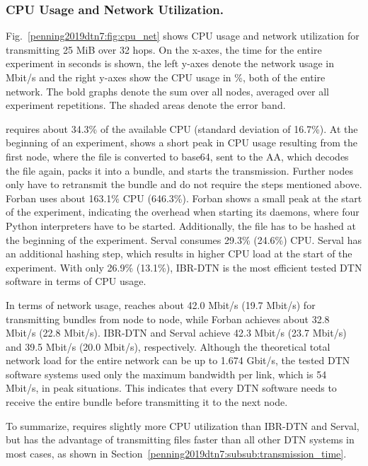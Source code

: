 \subsubsection{CPU Usage and Network Utilization.}


Fig.~\ref{penning2019dtn7:fig:cpu_net} shows CPU usage and network utilization for transmitting 25 MiB over 32 hops.
On the x-axes, the time for the entire experiment in seconds is shown, the left y-axes denote the network usage in Mbit/s and the right y-axes show the CPU usage in \%, both of the entire network.
The bold graphs denote the sum over all nodes, averaged over all experiment repetitions.
The shaded areas denote the error band.

\dtn requires about 34.3\% of the available CPU (standard deviation of 16.7\%).
At the beginning of an experiment, \dtn shows a short peak in CPU usage resulting from the first node, where the file is converted to base64, sent to the \dtn AA, which decodes the file again, packs it into a bundle, and starts the transmission.
Further nodes only have to retransmit the bundle and do not require the steps mentioned above.
Forban uses about 163.1\% CPU (646.3\%).
Forban shows a small peak at the start of the experiment, indicating the overhead when starting its daemons, where four Python interpreters have to be started.
Additionally, the file has to be hashed at the beginning of the experiment.
Serval consumes 29.3\% (24.6\%) CPU.
Serval has an additional hashing step, which results in higher CPU load at the start of the experiment.
With only 26.9\% (13.1\%), IBR-DTN is the most efficient tested DTN software in terms of CPU usage.



In terms of network usage, \dtn reaches about 42.0 Mbit/s (19.7 Mbit/s) for transmitting bundles from node to node, while Forban achieves about 32.8 Mbit/s (22.8 Mbit/s).
IBR-DTN and Serval achieve 42.3 Mbit/s (23.7 Mbit/s) and 39.5 Mbit/s (20.0 Mbit/s), respectively.
Although the theoretical total network load for the entire network can be up to 1.674 Gbit/s, the tested DTN software systems used only the maximum bandwidth per link, which is 54 Mbit/s, in peak situations.
This indicates that every DTN software needs to receive the entire bundle before transmitting it to the next node.


To summarize, \dtn requires slightly more CPU utilization than IBR-DTN and Serval, but has the advantage of transmitting files faster than all other DTN systems in most cases, as shown in Section~\ref{penning2019dtn7:subsub:transmission_time}.

